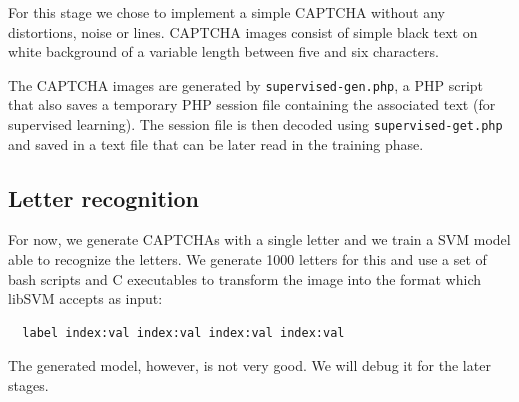 \documentclass[a4paper,12pt]{article}
\begin{document}
For this stage we chose to implement a simple CAPTCHA without any distortions,
noise or lines. CAPTCHA images consist of simple black text on white
background of a variable length between five and six characters.

The CAPTCHA images are generated by \texttt{supervised-gen.php}, a PHP
script that also saves a temporary PHP session file containing the associated
text (for supervised learning). The session file is then decoded using 
\texttt{supervised-get.php} and saved in a text file that can be later
read in the training phase.

\subsection*{Letter recognition}

For now, we generate CAPTCHAs with a single letter and we train a SVM model
able to recognize the letters. We generate 1000 letters for this and use a set
of bash scripts and C executables to transform the image into the format which
libSVM accepts as input:

\begin{verbatim}
  label index:val index:val index:val index:val
\end{verbatim}

The generated model, however, is not very good. We will debug it for the later
stages.

\vskip 0.2in


\end{document}
